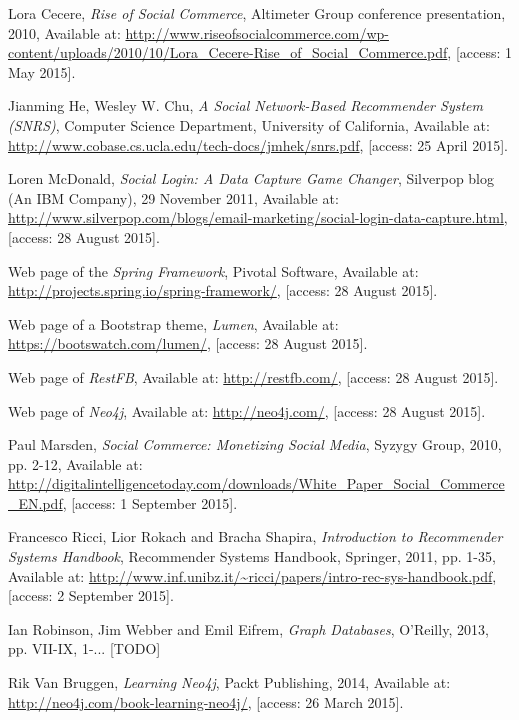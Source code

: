 \documentclass[12pt]{report}
\begin{document}
\begin{thebibliography}{99}

Lora Cecere, \textit{Rise of Social Commerce}, Altimeter Group conference presentation, 2010, Available at: \url{http://www.riseofsocialcommerce.com/wp-content/uploads/2010/10/Lora_Cecere-Rise_of_Social_Commerce.pdf}, [access: 1 May 2015].

Jianming He, Wesley W. Chu, \textit{A Social Network-Based Recommender System (SNRS)}, Computer Science Department, University of California, Available at: \url{http://www.cobase.cs.ucla.edu/tech-docs/jmhek/snrs.pdf}, [access: 25 April 2015].

Loren McDonald, \textit{Social Login: A Data Capture Game Changer}, Silverpop blog (An IBM Company), 29 November 2011, Available at: \url{http://www.silverpop.com/blogs/email-marketing/social-login-data-capture.html}, [access: 28 August 2015].

Web page of the \textit{Spring Framework}, Pivotal Software, Available at: \url{http://projects.spring.io/spring-framework/}, [access: 28 August 2015].

Web page of a Bootstrap theme, \textit{Lumen}, Available at: \url{https://bootswatch.com/lumen/}, [access: 28 August 2015].

Web page of \textit{RestFB}, Available at: \url{http://restfb.com/}, [access: 28 August 2015].

Web page of \textit{Neo4j}, Available at: \url{http://neo4j.com/}, [access: 28 August 2015].

Paul Marsden, \textit{Social Commerce: Monetizing Social Media}, Syzygy Group, 2010, pp. 2-12, Available at: \url{http://digitalintelligencetoday.com/downloads/White_Paper_Social_Commerce_EN.pdf}, [access: 1 September 2015].

Francesco Ricci, Lior Rokach and Bracha Shapira, \textit{Introduction to Recommender Systems Handbook}, Recommender Systems Handbook, Springer, 2011, pp. 1-35, Available at: \url{http://www.inf.unibz.it/~ricci/papers/intro-rec-sys-handbook.pdf}, [access: 2 September 2015].

Ian Robinson, Jim Webber and Emil Eifrem, \textit{Graph Databases}, O'Reilly, 2013, pp. VII-IX, 1-... [TODO]

Rik Van Bruggen, \textit{Learning Neo4j}, Packt Publishing, 2014, Available at: \url{http://neo4j.com/book-learning-neo4j/}, [access: 26 March 2015].

\end{thebibliography}

\listoffigures

\listoftables
\end{document}
